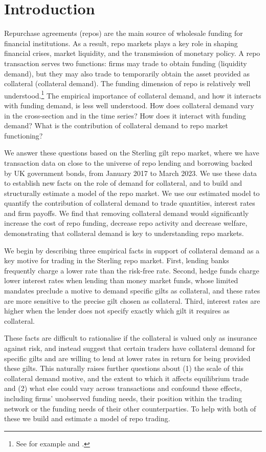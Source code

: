 
\section{Introduction}\label{sec:intro}

Repurchase agreements (repos) are the main source of wholesale funding for financial institutions. As a result, repo markets plays a key role in shaping financial crises, market liquidity, and the transmission of monetary policy. A repo transaction serves two functions: firms may trade to obtain funding (liquidity demand), but they may also trade to temporarily obtain the asset provided as collateral (collateral demand). The funding dimension of repo is relatively well understood.\footnote{See for example \cite{julliard2019drives} and \cite{brunnermeier2009market}.} The empirical importance of collateral demand, and how it interacts with funding demand, is less well understood. How does collateral demand vary in the cross-section and in the time series? How does it interact with funding demand? What is the contribution of collateral demand to repo market functioning?

We answer these questions based on the Sterling gilt repo market, where we have transaction data on close to the universe of repo lending and borrowing backed by UK government bonds, from January 2017 to March 2023. We use these data to establish new facts on the role of demand for collateral, and to build and structurally estimate a model of the repo market. We use our estimated model to quantify the contribution of collateral demand to trade quantities, interest rates and firm payoffs. We find that removing collateral demand would significantly increase the cost of repo funding, decrease repo activity and decrease welfare, demonstrating that collateral demand is key to understanding repo markets.

We begin by describing three empirical facts in support of collateral demand as a key motive for trading in the Sterling repo market. First, lending banks frequently charge a lower rate than the risk-free rate. Second, hedge funds charge lower interest rates when lending than money market funds, whose limited mandates preclude a motive to demand specific gilts as collateral, and these rates are more sensitive to the precise gilt chosen as collateral. Third, interest rates are higher when the lender does not specify exactly which gilt it requires as collateral.

These facts are difficult to rationalise if the collateral is valued only as insurance against risk, and instead suggest that certain traders have collateral demand for specific gilts and are willing to lend at lower rates in return for being provided these gilts. This naturally raises further questions about (1) the scale of this collateral demand motive, and the extent to which it affects equilibrium trade and (2) what else could vary across transactions and confound these effects, including firms' unobserved funding needs, their position within the trading network or the funding needs of their other counterparties. To help with both of these we build and estimate a model of repo trading.

